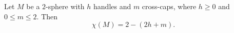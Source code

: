 Let $M$ be a $2$-sphere with $h$ handles and $m$ cross-caps, where $h \geqslant 0$ and $0 \leqslant m \leqslant 2$. Then
$$\chi(M) = 2 - (2h + m).$$
